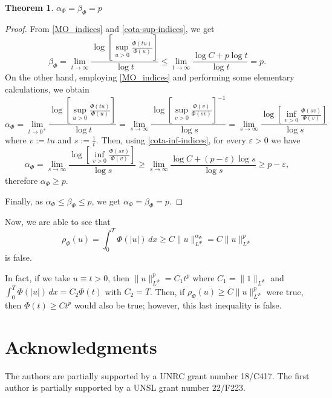 \documentclass[twoside]{article}
\newtheorem{thm}{Theorem}[section]
\theoremstyle{remark}
\newcommand{\orlnor}{\|_{L^{\Phi}}}
\renewcommand{\leq}{\leqslant}
\begin{document}
\begin{thm}
$\alpha_{\Phi}=\beta_{\Phi}=p$
\end{thm}

\begin{proof}
From \eqref{MO_indices} and \eqref{cota-sup-indices}, we get 
\[
\beta_{\Phi}=\lim\limits_{t \to \infty} \frac{\log\left[\sup\limits_{u>0} \frac{\Phi(tu)}{\Phi(u)}\right]}{\log t}
\leq
\lim \limits_{t \to \infty} \frac{\log C+p\log t}{\log t}=p.
\]
On the other hand, employing \eqref{MO_indices} and performing some elementary calculations, we obtain
\[
\alpha_{\Phi}=
\lim\limits_{t \to 0^+} \frac{\log\left[\sup\limits_{u>0} \frac{\Phi(tu)}{\Phi(u)}\right]}{\log t}=
\lim\limits_{s \to \infty} \frac{\log\left[\sup\limits_{v>0} \frac{\Phi(v)}{\Phi(sv)}\right]^{-1}}{\log s}=
\lim\limits_{s \to \infty} \frac{\log\left[\inf\limits_{v>0} \frac{\Phi(sv)}{\Phi(v)}\right]}{\log s}
\]
where $v:=tu$ and $s:=\frac{1}{t}$.
Then, using \eqref{cota-inf-indices},  for every $\varepsilon>0$ we have
\[
\alpha_{\Phi}=
\lim\limits_{s \to \infty} \frac{\log\left[\inf\limits_{v>0} \frac{\Phi(sv)}{\Phi(v)}\right]}{\log s}\geq
\lim\limits_{s \to \infty} \frac{\log C+(p-\varepsilon)\log s}{\log s}\geq p-\varepsilon,
\]
therefore $\alpha_{\Phi}\geq p$. 

Finally, as $\alpha_{\Phi}\leq \beta_{\Phi}\leq p$, we get  
$\alpha_{\Phi}=\beta_{\Phi}=p$.
\end{proof}



Now, we are able to see that 
\[
\rho_{\Phi}(u)=\int_0^T \Phi(|u|)\,dx\geq C\|u\orlnor^{\alpha_{\Phi}}=C\|u\orlnor^p
\]
is false.

In fact, if we take $u\equiv t>0$, then $\|u\orlnor^p=C_1t^p$ where $C_1=\|1\orlnor$ and
$\int_0^T \Phi(|u|)\,dx=C_2\Phi(t)$ with $C_2=T$. 
Then, if $\rho_{\Phi}(u)\geq C\|u\orlnor^p$ were true, then $\Phi(t)\geq C t^p$ would also be true; however, this
last inequality is false.
 



\section*{Acknowledgments}
The authors are partially supported by a UNRC grant number 18/C417. The first author is  partially supported by a  UNSL grant number 22/F223. 


  
 
\end{document}
